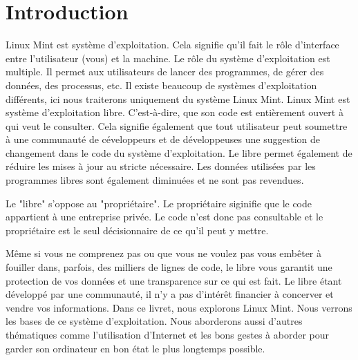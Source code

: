 \documentclass[12pt]{book}
\begin{document}
\chapter{Introduction}
Linux Mint est système d'exploitation.
Cela signifie qu'il fait le rôle d'interface entre l'utilisateur (vous) et la machine.
Le rôle du système d'exploitation est multiple.
Il permet aux utilisateurs de lancer des programmes, de gérer des données, des processus, etc.
Il existe beaucoup de systèmes d'exploitation différents, ici nous traiterons uniquement du système Linux Mint.
Linux Mint est système d'exploitation libre.
C'est-à-dire, que son code est entièrement ouvert à qui veut le consulter.
Cela signifie également que tout utilisateur peut soumettre à une communauté de céveloppeurs et de développeuses une suggestion de changement dans le code du système d'exploitation.
Le libre permet également de réduire les mises à jour au stricte nécessaire.
Les données utilisées par les programmes libres sont également diminuées et ne sont pas revendues.\par
Le "libre" s'oppose au "propriétaire".
Le propriétaire siginifie que le code appartient à une entreprise privée.
Le code n'est donc pas consultable et le propriétaire est le seul décisionnaire de ce qu'il peut y mettre.\par
Même si vous ne comprenez pas ou que vous ne voulez pas vous embêter à fouiller dans, parfois, des milliers de lignes de code, le libre vous garantit une protection de vos données et une transparence sur ce qui est fait.
Le libre étant développé par une communauté, il n'y a pas d'intérêt financier à concerver et vendre vos informations.
Dans ce livret, nous explorons Linux Mint.
Nous verrons les bases de ce système d'exploitation.
Nous aborderons aussi d'autres thématiques comme l'utilisation d'Internet et les bons gestes à aborder pour garder son ordinateur en bon état le plus longtemps possible.
\end{document}
